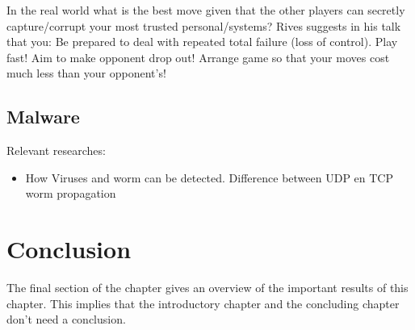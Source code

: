 In the real world what is the best move given that the other players can secretly capture/corrupt your most trusted personal/systems? Rives suggests in his talk that you:
Be prepared to deal with repeated total failure (loss of control).
Play fast! Aim to make opponent drop out!
Arrange game so that your moves cost much less than your opponent's!



\subsection{Malware}
Relevant researches:
\begin{itemize}
\item How Viruses and worm can be detected. Difference between UDP en TCP worm propagation
\end{itemize}




\section{Conclusion}
\label{Cha:1:Conclusion}
The final section of the chapter gives an overview of the important results
of this chapter. This implies that the introductory chapter and the
concluding chapter don't need a conclusion.



%


